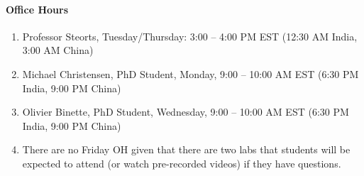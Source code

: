 \documentclass[11pt]{article}
\begin{document}
\paragraph{Office Hours}
\begin{enumerate}
\item Professor Steorts, Tuesday/Thursday: 3:00 -- 4:00 PM EST (12:30 AM India, 3:00 AM China)
\item Michael Christensen, PhD Student, Monday, 9:00 -- 10:00 AM EST (6:30 PM India, 9:00 PM China) 
\item Olivier Binette, PhD Student, Wednesday, 9:00 -- 10:00 AM EST (6:30 PM India, 9:00 PM China) 
\item There are no Friday OH given that there are two labs that students will be expected to attend (or watch pre-recorded videos) if they have questions. 
\end{enumerate}





%
%
%

\end{document}
